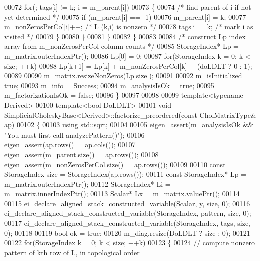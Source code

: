 \begin{DoxyCode}
00072         \textcolor{keywordflow}{for}(; tags[i] != k; i = m\_parent[i])
00073         \{
00074           \textcolor{comment}{/* find parent of i if not yet determined */}
00075           \textcolor{keywordflow}{if} (m\_parent[i] == -1)
00076             m\_parent[i] = k;
00077           m\_nonZerosPerCol[i]++;        \textcolor{comment}{/* L (k,i) is nonzero */}
00078           tags[i] = k;                  \textcolor{comment}{/* mark i as visited */}
00079         \}
00080       \}
00081     \}
00082   \}
00083 
00084   \textcolor{comment}{/* construct Lp index array from m\_nonZerosPerCol column counts */}
00085   StorageIndex* Lp = m\_matrix.outerIndexPtr();
00086   Lp[0] = 0;
00087   \textcolor{keywordflow}{for}(StorageIndex k = 0; k < size; ++k)
00088     Lp[k+1] = Lp[k] + m\_nonZerosPerCol[k] + (doLDLT ? 0 : 1);
00089 
00090   m\_matrix.resizeNonZeros(Lp[size]);
00091 
00092   m\_isInitialized     = \textcolor{keyword}{true};
00093   m\_info              = \hyperlink{group__enums_gga85fad7b87587764e5cf6b513a9e0ee5ea52581b035f4b59c203b8ff999ef5fcea}{Success};
00094   m\_analysisIsOk      = \textcolor{keyword}{true};
00095   m\_factorizationIsOk = \textcolor{keyword}{false};
00096 \}
00097 
00098 
00099 \textcolor{keyword}{template}<\textcolor{keyword}{typename} Derived>
00100 \textcolor{keyword}{template}<\textcolor{keywordtype}{bool} DoLDLT>
00101 \textcolor{keywordtype}{void} SimplicialCholeskyBase<Derived>::factorize\_preordered(\textcolor{keyword}{const} CholMatrixType& ap)
00102 \{
00103   \textcolor{keyword}{using} std::sqrt;
00104 
00105   eigen\_assert(m\_analysisIsOk && \textcolor{stringliteral}{"You must first call analyzePattern()"});
00106   eigen\_assert(ap.rows()==ap.cols());
00107   eigen\_assert(m\_parent.size()==ap.rows());
00108   eigen\_assert(m\_nonZerosPerCol.size()==ap.rows());
00109 
00110   \textcolor{keyword}{const} StorageIndex size = StorageIndex(ap.rows());
00111   \textcolor{keyword}{const} StorageIndex* Lp = m\_matrix.outerIndexPtr();
00112   StorageIndex* Li = m\_matrix.innerIndexPtr();
00113   Scalar* Lx = m\_matrix.valuePtr();
00114 
00115   ei\_declare\_aligned\_stack\_constructed\_variable(Scalar, y, size, 0);
00116   ei\_declare\_aligned\_stack\_constructed\_variable(StorageIndex,  pattern, size, 0);
00117   ei\_declare\_aligned\_stack\_constructed\_variable(StorageIndex,  tags, size, 0);
00118 
00119   \textcolor{keywordtype}{bool} ok = \textcolor{keyword}{true};
00120   m\_diag.resize(DoLDLT ? size : 0);
00121 
00122   \textcolor{keywordflow}{for}(StorageIndex k = 0; k < size; ++k)
00123   \{
00124     \textcolor{comment}{// compute nonzero pattern of kth row of L, in topological order}

\end{DoxyCode}
